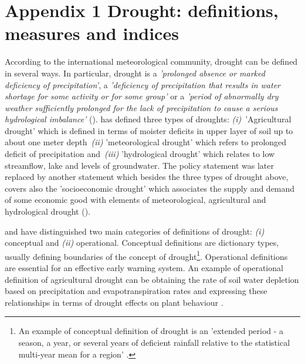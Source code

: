 \documentclass[a4paper,12pt]{article}
\begin{document}
\makeatletter 
\renewcommand{\thesection}{\hspace*{-1.0em}}
\newpage
\linespread{1}

%


\newpage


\setcounter{table}{0} 
\makeatletter 
\renewcommand{\thetable}{A\@arabic \c@table} 
\FloatBarrier


\section{Appendix 1 Drought: definitions, measures and indices}
According to the international meteorological community, drought can be defined in several ways. In particular, drought is a \textit{'prolonged absence or marked deficiency of precipitation'}, a \textit{'deficiency of precipitation that results in water shortage for some activity or for some group'} or a \textit{'period of abnormally dry weather sufficiently prolonged for the lack of precipitation to cause a serious hydrological imbalance'} (\citealp{Heim2002, IPCCtrenberth}).
 \cite{AMS1997} has defined three types of droughts: \textit{(i)}~'Agricultural drought' which is defined in terms of moister deficits in upper layer of soil up to about one meter depth~\textit{(ii)} 'meteorological drought' which refers to prolonged deficit of precipitation and~\textit{(iii)} 'hydrological drought' which relates to low streamflow, lake and levels of groundwater. The  \cite{AMS1997} policy statement was later replaced by another statement \citep{AMS2013} which besides the three types of drought above, covers also the 'socioeconomic drought' which associates the supply and demand of some economic good with elements of meteorological, agricultural and hydrological drought (\citealt{Heim2002, IPCCtrenberth}).
 
\cite{wilhite1985} and \cite{wilhite2000} have distinguished two main categories of definitions of drought: \textit{(i)} conceptual and \textit{(ii)} operational. Conceptual definitions are dictionary types, usually defining boundaries of the concept of drought\footnote{An example of conceptual definition of drought is an 'extended period - a season, a year, or several years of deficient rainfall relative to the statistical multi-year mean for a region' \cite{schneider1996}.}. Operational definitions are essential for an effective early warning system. An example of operational definition of agricultural drought can be obtaining the rate of soil water depletion based on precipitation and evapotranspiration rates and expressing these relationships in terms of drought effects on plant behaviour \citep{wilhite2000}.
\end{document}
